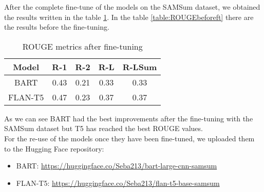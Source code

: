 \documentclass[10pt,twocolumn,letterpaper]{article}
\begin{document}
After the complete fine-tune of the models on the SAMSum dataset, we obtained the results written in the 
table \ref{table:ROUGEafterft}. In the table \ref{table:ROUGEbeforeft} there are the results before the fine-tuning.
\begin{table}[h!]
    \centering
    \begin{tabular}{|c|c|c|c|c|}
        \hline
        \rowcolor{lightergray}
        Model & R-1 & R-2 & R-L & R-LSum \\ 
        \hline
        BART & 0.43 & 0.21 & 0.33 & 0.33\\
        FLAN-T5 & 0.47 & 0.23 & 0.37 & 0.37 \\
        \hline
    \end{tabular}
    \caption{ROUGE metrics after fine-tuning}
    \label{table:ROUGEafterft}
\end{table}

As we can see BART had the best improvements after the fine-tuning with the SAMSum dataset but T5 has reached 
the best ROUGE values.\\
For the re-use of the models once they have been fine-tuned, we uploaded them to the Hugging Face repository:
\begin{itemize}
    \item BART: \url{https://huggingface.co/Seba213/bart-large-cnn-samsum}
    \item FLAN-T5: \url{https://huggingface.co/Seba213/flan-t5-base-samsum}
\end{itemize}
\end{document}
